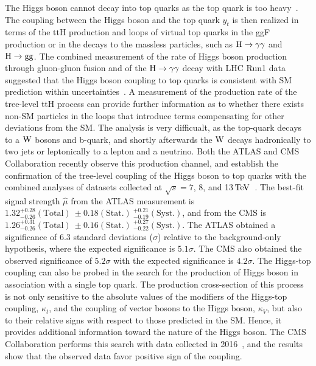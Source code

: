 The Higgs boson cannot decay into top quarks as the top quark is too heavy~\cite{LHCTOPWG}. The coupling between the Higgs boson and the top quark $y_{t}$ is then realized in terms of the ttH production and loops of virtual top quarks in the ggF production or in the decays to the massless particles, such as $\mathrm{H}\to\gamma\gamma$ and $\mathrm{H}\to\mathrm{g}\mathrm{g}$. The combined measurement of the rate of Higgs boson production through gluon-gluon fusion and of the $\mathrm{H}\to\gamma\gamma$ decay with LHC Run1 data suggested that the Higgs boson coupling to top quarks is consistent with SM prediction within uncertainties~\cite{Khachatryan:2016vau}. A measurement of the production rate of the tree-level ttH process can provide further information as to whether there exists non-SM particles in the loops that introduce terms compensating for other deviations from the SM. The analysis is very difficualt, as the top-quark decays to a $\mathrm{W}$ bosons and b-quark, and shortly afterwards the $\mathrm{W}$ decays hadronically to two jets or leptonically to a lepton and a neutrino. Both the ATLAS and CMS Collaboration recently observe this production channel, and establish the confirmation of the tree-level coupling of the Higgs boson to top quarks with the combined analyses of datasets collected at $\sqrt{s}=7$, 8, and 13$\,\text{Te\hspace{-.08em}V}$~\cite{Aaboud:2018urx,Sirunyan:2018hoz}. The best-fit signal strength $\hat{\mu}$ from the ATLAS measurement is $1.32^{+0.28}_{-0.26}(\text{Total})\ \pm 0.18(\text{Stat.})\ ^{+0.21}_{-0.19}(\text{Syst.})$, and from the CMS is $1.26^{+0.31}_{-0.26}(\text{Total})\ \pm 0.16(\text{Stat.})\ ^{+0.27}_{-0.22}(\text{Syst.})$. The ATLAS obtained a significance of 6.3 standard deviations ($\sigma$) relative to the background-only hypothesis, where the expected significance is $5.1\sigma$. The CMS also obtained the observed significance of $5.2\sigma$ with the expected significance is $4.2\sigma$. The Higgs-top coupling can also be probed in the search for the production of Higgs boson in association with a single top quark. The production cross-section of this process is not only sensitive to the absolute values of the modifiers of the Higgs-top coupling, $\kappa_{t}$, and the coupling of vector bosons to the Higgs boson, $\kappa_{V}$, but also to their relative signs with respect to those predicted in the SM. Hence, it provides additional information toward the nature of the Higgs boson. The CMS Collaboration performs this search with data collected in 2016~\cite{CMS-PAS-HIG-18-009}, and the results show that the observed data favor positive sign of the coupling.

